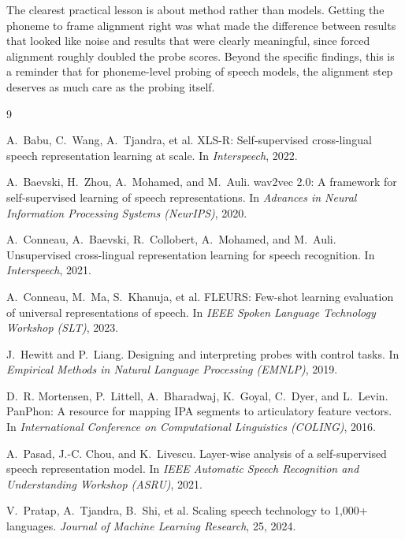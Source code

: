 \documentclass[twoside,11pt]{article}
\begin{document}
The clearest practical lesson is about method rather than models. Getting the
phoneme to frame alignment right was what made the difference between results that
looked like noise and results that were clearly meaningful, since forced alignment
roughly doubled the probe scores. Beyond the specific findings, this is a reminder
that for phoneme-level probing of speech models, the alignment step deserves as much
care as the probing itself.

\clearpage
\begin{thebibliography}{9}

A.~Babu, C.~Wang, A.~Tjandra, et al.
\newblock XLS-R: Self-supervised cross-lingual speech representation learning at
scale.
\newblock In \emph{Interspeech}, 2022.

A.~Baevski, H.~Zhou, A.~Mohamed, and M.~Auli.
\newblock wav2vec 2.0: A framework for self-supervised learning of speech
representations.
\newblock In \emph{Advances in Neural Information Processing Systems (NeurIPS)},
2020.

A.~Conneau, A.~Baevski, R.~Collobert, A.~Mohamed, and M.~Auli.
\newblock Unsupervised cross-lingual representation learning for speech
recognition.
\newblock In \emph{Interspeech}, 2021.

A.~Conneau, M.~Ma, S.~Khanuja, et al.
\newblock FLEURS: Few-shot learning evaluation of universal representations of
speech.
\newblock In \emph{IEEE Spoken Language Technology Workshop (SLT)}, 2023.

J.~Hewitt and P.~Liang.
\newblock Designing and interpreting probes with control tasks.
\newblock In \emph{Empirical Methods in Natural Language Processing (EMNLP)},
2019.

D.~R. Mortensen, P.~Littell, A.~Bharadwaj, K.~Goyal, C.~Dyer, and L.~Levin.
\newblock PanPhon: A resource for mapping IPA segments to articulatory feature
vectors.
\newblock In \emph{International Conference on Computational Linguistics
(COLING)}, 2016.

A.~Pasad, J.-C. Chou, and K.~Livescu.
\newblock Layer-wise analysis of a self-supervised speech representation model.
\newblock In \emph{IEEE Automatic Speech Recognition and Understanding Workshop
(ASRU)}, 2021.

V.~Pratap, A.~Tjandra, B.~Shi, et al.
\newblock Scaling speech technology to 1{,}000+ languages.
\newblock \emph{Journal of Machine Learning Research}, 25, 2024.

\end{thebibliography}
\end{document}
